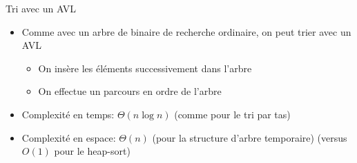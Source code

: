 \begin{frame}{Tri avec un AVL}

\begin{itemize}
\item Comme avec un arbre de binaire de recherche ordinaire, on peut trier avec un AVL
\begin{itemize}
\item On insère les éléments successivement dans l'arbre
\item On effectue un parcours en ordre de l'arbre
\end{itemize}
\item Complexité en temps: $\Theta(n\log n)$ (comme pour le tri par tas)
\item Complexité en espace: $\Theta(n)$ (pour la structure d'arbre temporaire) (versus $O(1)$ pour le heap-sort)
\end{itemize}

\end{frame}



